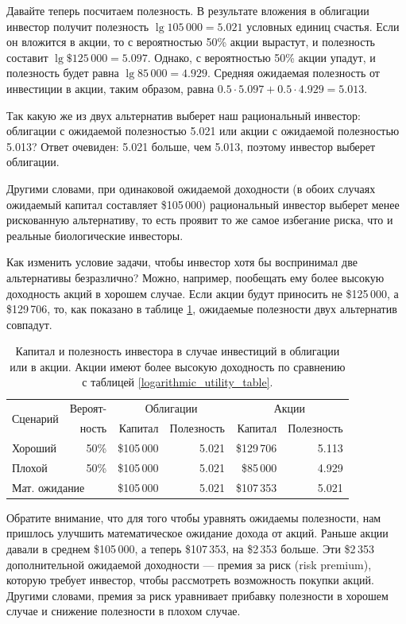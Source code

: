 Давайте теперь посчитаем полезность. В результате вложения в облигации инвестор 
получит полезность $\lg 105\,000 = 5.021$ условных единиц счастья. Если он 
вложится в акции, то с вероятностью 50\% акции вырастут, и полезность составит
$\lg \$125\,000 = 5.097$. Однако, с вероятностью 50\% акции упадут, и полезность 
будет равна  $\lg 85\,000 = 4.929$. Средняя ожидаемая полезность от инвестиции в 
акции, таким образом, равна $0.5 \cdot 5.097 + 0.5 \cdot 4.929 = 5.013$.
  
Так какую же из двух альтернатив выберет наш рациональный инвестор: облигации с 
ожидаемой полезностью 5.021 или акции с ожидаемой полезностью 5.013? Ответ 
очевиден: 5.021 больше, чем 5.013, поэтому инвестор выберет облигации.

Другими словами, при одинаковой ожидаемой доходности (в обоих случаях ожидаемый 
капитал составляет \$105\,000) рациональный инвестор выберет менее рискованную 
альтернативу, то есть проявит то же самое избегание риска, что и реальные 
биологические инвесторы.

Как изменить условие задачи, чтобы инвестор хотя бы воспринимал две альтернативы 
безразлично? Можно, например, пообещать ему более высокую доходность акций в 
хорошем случае. Если акции будут приносить не \$125\,000, а \$129\,706, то, как 
показано в таблице \ref{logarithmic_utility_table_premium}, ожидаемые полезности 
двух альтернатив совпадут.

 \begin{table}[h]
 \centering
 \begin{tabular}{l|r|r|r|r|r}
\multirow{2}{*}{Сценарий} & Вероят- & \multicolumn{2}{c|}{Облигации} & \multicolumn{2}{c}{Акции} \\
\cline{3-6}
        &  ность   & Капитал    & Полезность & Капитал      & Полезность \\ \hline
Хороший & 50\% & \$105\,000 & 5.021    & \$129\,706 & 5.113 \\
Плохой  & 50\% & \$105\,000 & 5.021    & \$85\,000  & 4.929 \\ \hline
\multicolumn{2}{l|}{Мат. ожидание}      & \$105\,000 & 5.021 & \$107\,353 & 5.021
\end{tabular}
\caption{Капитал и полезность инвестора в случае инвестиций в облигации или в акции. Акции имеют более высокую доходность по сравнению с таблицей \ref{logarithmic_utility_table}.}
\label{logarithmic_utility_table_premium}
 \end{table}
 
Обратите внимание, что для того чтобы уравнять ожидаемы полезности, нам пришлось 
улучшить математическое ожидание дохода от акций. Раньше акции давали в среднем 
\$105\,000, а теперь \$107\,353, на \$2\,353 больше. Эти \$2\,353 дополнительной 
ожидаемой доходности --- премия за риск (risk premium), которую требует 
инвестор, чтобы рассмотреть возможность покупки акций. Другими словами, премия 
за риск уравнивает прибавку полезности в хорошем случае и снижение полезности в 
плохом случае. 
 

